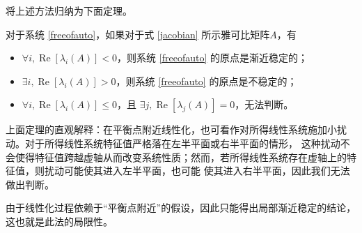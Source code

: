   将上述方法归纳为下面定理。
  \begin{theorem}[通过线性化判别非线性系统稳定性]
    对于系统 \eqref{freeofauto}，如果对于式 \eqref{jacobian} 所示雅可比矩阵$A$，有
    \begin{itemize}[leftmargin=1em]
    \item $\forall i, \ensuremath{\operatorname{Re}} [\lambda_i (A)] < 0$，则系统 \eqref{freeofauto} 的原点是渐近稳定的；
    \item $\exists i, \ensuremath{\operatorname{Re}} [\lambda_i (A)] > 0$，则系统 \eqref{freeofauto} 的原点是不稳定的；
    \item $\forall i, \ensuremath{\operatorname{Re}} [\lambda_i (A)] \le 0$，且
    $\exists j, \ensuremath{\operatorname{Re}} [\lambda_j (A)] = 0$，无法判断。
    \end{itemize}
  \end{theorem}
  \begin{note}
    上面定理的直观解释：在平衡点附近线性化，也可看作对所得线性系统施加小扰动。对于所得线性系统特征值严格落在左半平面或右半平面的情形，
    这种扰动不会使得特征值跨越虚轴从而改变系统性质；然而，若所得线性系统存在虚轴上的特征值，则扰动可能使其进入左半平面，也可能
    使其进入右半平面，因此我们无法做出判断。

    由于线性化过程依赖于“平衡点附近”的假设，因此只能得出局部渐近稳定的结论，这也就是此法的局限性。
  \end{note}
  \newpage
